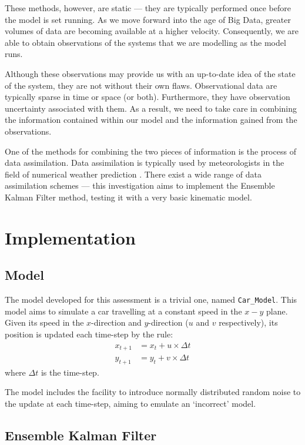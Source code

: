 \documentclass[a4paper, 12pt, twoside]{article}
\begin{document}
These methods, however, are static --- they are typically performed once before
the model is set running.
As we move forward into the age of Big Data, greater volumes of data are
becoming available at a higher velocity.
Consequently, we are able to obtain observations of the systems that we are
modelling as the model runs.

Although these observations may provide us with an up-to-date idea of the state
of the system, they are not without their own flaws.
Observational data are typically sparse in time or space (or both).
Furthermore, they have observation uncertainty associated with them.
As a result, we need to take care in combining the information contained within
our model and the information gained from the observations.

One of the methods for combining the two pieces of information is the process of
data assimilation.
Data assimilation is typically used by meteorologists in the field of numerical
weather prediction \citep{kalnay2003atmospheric}.
There exist a wide range of data assimilation schemes --- this investigation
aims to implement the Ensemble Kalman Filter method, testing it with a very
basic kinematic model.

\section{Implementation}\label{sec:implementation}

\subsection{Model}\label{sub:model}

The model developed for this assessment is a trivial one, named
\texttt{Car\_Model}.
This model aims to simulate a car travelling at a constant speed in the $x-y$
plane.
Given its speed in the $x$-direction and $y$-direction ($u$ and $v$
respectively), its position is updated each time-step by the rule:
\begin{align}
    x_{t+1} &= x_{t} + u \times \Delta t \\
    y_{t+1} &= y_{t} + v \times \Delta t
\end{align}
where $\Delta t$ is the time-step.

The model includes the facility to introduce normally distributed random noise
to the update at each time-step, aiming to emulate an `incorrect' model.

\subsection{Ensemble Kalman Filter}\label{sub:enkf}
\end{document}
